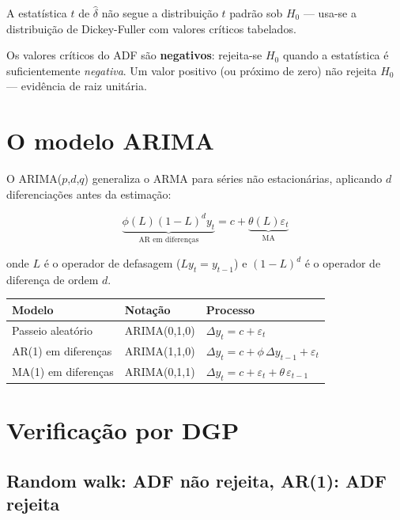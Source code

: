 A estatística $t$ de $\hat\delta$ não segue a distribuição $t$ padrão sob
$H_0$ — usa-se a distribuição de Dickey-Fuller com valores críticos
tabelados.

\begin{aviso}
  Os valores críticos do ADF são \textbf{negativos}: rejeita-se $H_0$
  quando a estatística é suficientemente \emph{negativa}. Um valor positivo
  (ou próximo de zero) não rejeita $H_0$ — evidência de raiz unitária.
\end{aviso}

\section{O modelo ARIMA}

O ARIMA($p$,$d$,$q$) generaliza o ARMA para séries não estacionárias,
aplicando $d$ diferenciações antes da estimação:

\[
  \underbrace{\phi(L)(1-L)^d y_t}_{\text{AR em diferenças}}
  = c + \underbrace{\theta(L)\varepsilon_t}_{\text{MA}}
\]

onde $L$ é o operador de defasagem ($Ly_t = y_{t-1}$) e $(1-L)^d$ é o
operador de diferença de ordem $d$.

\begin{center}
\begin{tabular}{lll}
\toprule
\textbf{Modelo} & \textbf{Notação} & \textbf{Processo} \\
\midrule
Passeio aleatório & ARIMA(0,1,0) & $\Delta y_t = c + \varepsilon_t$ \\
AR(1) em diferenças & ARIMA(1,1,0) & $\Delta y_t = c + \phi\,\Delta y_{t-1} + \varepsilon_t$ \\
MA(1) em diferenças & ARIMA(0,1,1) & $\Delta y_t = c + \varepsilon_t + \theta\,\varepsilon_{t-1}$ \\
\bottomrule
\end{tabular}
\end{center}

\section{Verificação por DGP}

\subsection*{Random walk: ADF não rejeita, AR(1): ADF rejeita}

